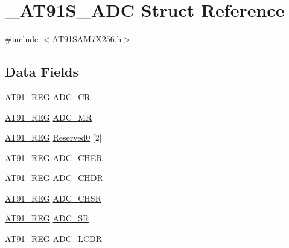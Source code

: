 \hypertarget{struct__AT91S__ADC}{\section{\-\_\-\-A\-T91\-S\-\_\-\-A\-D\-C Struct Reference}
\label{struct__AT91S__ADC}
}


{\ttfamily \#include $<$A\-T91\-S\-A\-M7\-X256.\-h$>$}

\subsection*{Data Fields}
\begin{DoxyCompactItemize}
\item 
\hyperlink{GCC_2ARM7__AT91SAM7S_2AT91SAM7X256_8h_a712ad5a1ac1bd02f3e95a7526c283ce1}{A\-T91\-\_\-\-R\-E\-G} \hyperlink{struct__AT91S__ADC_a95a238b8829c398afbd6a1c51331a091}{A\-D\-C\-\_\-\-C\-R}
\item 
\hyperlink{GCC_2ARM7__AT91SAM7S_2AT91SAM7X256_8h_a712ad5a1ac1bd02f3e95a7526c283ce1}{A\-T91\-\_\-\-R\-E\-G} \hyperlink{struct__AT91S__ADC_a8803317070c9bb96c65a5cc06e3580c8}{A\-D\-C\-\_\-\-M\-R}
\item 
\hyperlink{GCC_2ARM7__AT91SAM7S_2AT91SAM7X256_8h_a712ad5a1ac1bd02f3e95a7526c283ce1}{A\-T91\-\_\-\-R\-E\-G} \hyperlink{struct__AT91S__ADC_a03592001549aa6f76212d9fe5492f025}{Reserved0} \mbox{[}2\mbox{]}
\item 
\hyperlink{GCC_2ARM7__AT91SAM7S_2AT91SAM7X256_8h_a712ad5a1ac1bd02f3e95a7526c283ce1}{A\-T91\-\_\-\-R\-E\-G} \hyperlink{struct__AT91S__ADC_acb154ebb26915055b93b17753a749ef5}{A\-D\-C\-\_\-\-C\-H\-E\-R}
\item 
\hyperlink{GCC_2ARM7__AT91SAM7S_2AT91SAM7X256_8h_a712ad5a1ac1bd02f3e95a7526c283ce1}{A\-T91\-\_\-\-R\-E\-G} \hyperlink{struct__AT91S__ADC_ae5d473e8c1718c585434a25dd7205467}{A\-D\-C\-\_\-\-C\-H\-D\-R}
\item 
\hyperlink{GCC_2ARM7__AT91SAM7S_2AT91SAM7X256_8h_a712ad5a1ac1bd02f3e95a7526c283ce1}{A\-T91\-\_\-\-R\-E\-G} \hyperlink{struct__AT91S__ADC_ab518314d82502388d3b769b90cc82c4c}{A\-D\-C\-\_\-\-C\-H\-S\-R}
\item 
\hyperlink{GCC_2ARM7__AT91SAM7S_2AT91SAM7X256_8h_a712ad5a1ac1bd02f3e95a7526c283ce1}{A\-T91\-\_\-\-R\-E\-G} \hyperlink{struct__AT91S__ADC_a077be6e0bd684a4641e5957f9d830c6c}{A\-D\-C\-\_\-\-S\-R}
\item 
\hyperlink{GCC_2ARM7__AT91SAM7S_2AT91SAM7X256_8h_a712ad5a1ac1bd02f3e95a7526c283ce1}{A\-T91\-\_\-\-R\-E\-G} \hyperlink{struct__AT91S__ADC_a4ec4d1ca9ff924989681cdec750b4faa}{A\-D\-C\-\_\-\-L\-C\-D\-R}

\end{DoxyCompactItemize}
